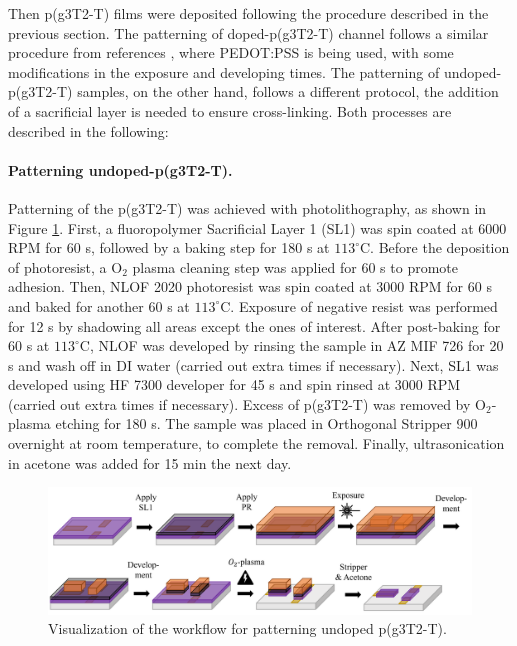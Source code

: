 Then p(g3T2-T) films were deposited following the procedure described in the previous section. The patterning of doped-p(g3T2-T) channel follows a similar procedure from references \cite{weissbachPhotopatternableSolidElectrolyte2022}\cite{bongartzOrganicElectrochemicalTransistors2021}, where PEDOT:PSS is being used, with some modifications in the exposure and developing times. The patterning of undoped-p(g3T2-T) samples, on the other hand, follows a different protocol, the addition of a sacrificial layer is needed to ensure cross-linking. Both processes are described in the following:

\paragraph{Patterning undoped-p(g3T2-T).}Patterning of the p(g3T2-T) was achieved with photolithography, as shown in Figure \ref{fig:undopedpat}. First, a fluoropolymer Sacrificial Layer 1 (SL1) was spin coated at 6000 RPM for 60 s, followed by a baking step for 180 s at $113^{\circ}$C. Before the deposition of photoresist, a O$_{2}$ plasma cleaning step was applied for 60 s to promote adhesion. Then, NLOF 2020 photoresist was spin coated at 3000 RPM for 60 s and baked for another 60 s at $113^{\circ}$C. Exposure of negative resist was performed for 12 s by shadowing all areas except the ones of interest. After post-baking for 60 s at $113^{\circ}$C, NLOF was developed by rinsing the sample in AZ MIF 726 for 20 s and wash off in DI water (carried out extra times if necessary). Next, SL1 was developed using HF 7300 developer for 45 s and spin rinsed at 3000 RPM (carried out extra times if necessary). Excess of p(g3T2-T) was removed by O$_{2}$-plasma etching for 180 s. The sample was placed in Orthogonal Stripper 900 overnight at room temperature, to complete the removal. Finally, ultrasonication in acetone was added for 15 min the next day. 

\begin{figure}[ht]
	\centering
	\includegraphics[width=12cm]{Images/pdf/undoped-patterning.pdf}
	\caption{Visualization of the workflow for patterning undoped p(g3T2-T).}
	\label{fig:undopedpat}
\end{figure}

